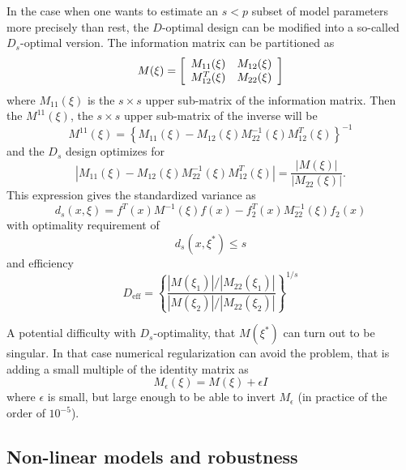 \documentclass[12pt]{iopart}
\begin{document}
In the case when one wants to estimate an $s < p$ subset of model parameters more precisely than rest, the $D$-optimal design can be modified into a so-called $D_s$-optimal version. The information matrix can be partitioned as
\begin{equation}
M(\xi) = \left[
  \begin{array}{l l}
    M_{11}(\xi)   & M_{12}(\xi)\\
    M^T_{12}(\xi) & M_{22}(\xi)
  \end{array} \right]
\end{equation}
where $M_{11}(\xi)$ is the $s \times s$ upper sub-matrix of the information matrix. Then the $M^{11}(\xi)$, the $s \times s$ upper sub-matrix of the inverse will be
\begin{equation}
M^{11}(\xi) = \left\{M_{11}(\xi) - M_{12}(\xi)M^{-1}_{22}(\xi)M^T_{12}(\xi)\right\}^{-1}
\end{equation}
and the $D_s$ design optimizes for 
\begin{equation}
|M_{11}(\xi) - M_{12}(\xi)M^{-1}_{22}(\xi)M^T_{12}(\xi)| = \frac{|M(\xi)|}{|M_{22}(\xi)|}.
\end{equation}
This expression gives the standardized variance as
\begin{equation}
d_s(x, \xi) = f^T(x) M^{-1}(\xi)f(x) - f_2^T(x) M_{22}^{-1}(\xi)f_2(x)
\label{eq:dsvar}
\end{equation}
with optimality requirement of
\begin{equation}
d_s(x, \xi^*) \leq s
\end{equation}
and efficiency
\begin{equation}
D_\mathrm{eff} = \left\{\frac{|M(\xi_1)|/|M_{22}(\xi_1)|}{|M(\xi_2)|/|M_{22}(\xi_2)|}\right\}^{1/s}
\end{equation}

A potential difficulty with $D_s$-optimality, that $M(\xi^*)$ can turn out to be singular. In that case numerical regularization can avoid the problem, that is adding a small multiple of the identity matrix as
\begin{equation}
M_\epsilon(\xi) = M(\xi)  + \epsilon I
\end{equation}  
where $\epsilon$ is small, but large enough to be able to invert $M_\epsilon$ (in practice of the order of $10^{-5}$).

\subsection{Non-linear models and robustness}
\end{document}
